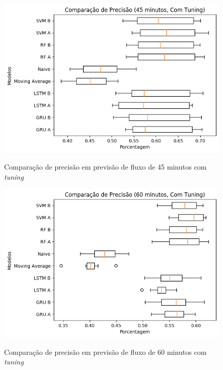 \begin{figure}[htbp]
    \centering
    \includegraphics[scale=0.8]{monography/img/snapshots/comparacao_de_precisao_(45_minutos,_com_tuning)_performance_boxes.png}
    \label{figure:comparacao_previsao_precisao_45_com_tuning}
    \caption{Comparação de precisão em previsão de fluxo de 45 minutos com \textit{tuning}}
\end{figure}

\begin{figure}[htbp]
    \centering
    \includegraphics[scale=0.8]{monography/img/snapshots/comparacao_de_precisao_(60_minutos,_com_tuning)_performance_boxes.png}
    \label{figure:comparacao_previsao_precisao_60_com_tuning}
    \caption{Comparação de precisão em previsão de fluxo de 60 minutos com \textit{tuning}}
\end{figure}

